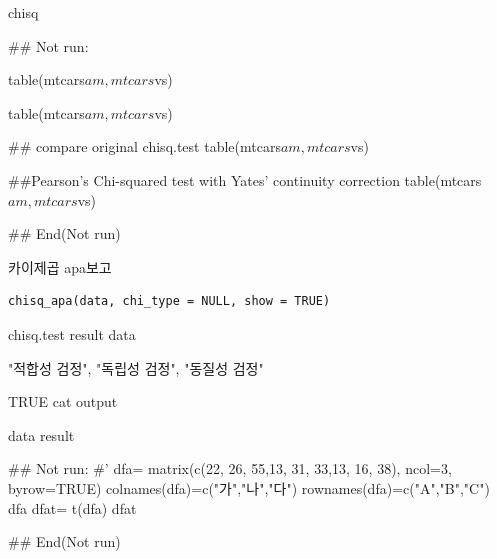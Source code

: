\documentclass[a4paper]{book}
\begin{document}
%
\begin{Value}
chisq
\end{Value}
%
\begin{Examples}
\begin{ExampleCode}
\#\# Not run: 

table(mtcars$am, mtcars$vs) %


table(mtcars$am, mtcars$vs) %

## compare original chisq.test
table(mtcars$am, mtcars$vs) %


##Pearson's Chi-squared test with Yates' continuity correction
table(mtcars$am, mtcars$vs) %

## End(Not run)


\end{ExampleCode}
\end{Examples}
%
\begin{Description}
카이제곱 apa보고
\end{Description}
%
\begin{Usage}
\begin{verbatim}
chisq_apa(data, chi_type = NULL, show = TRUE)
\end{verbatim}
\end{Usage}
%
\begin{Arguments}
\begin{ldescription}
\item[\code{data}] chisq.test result data

\item[\code{chi\_type}] "적합성 검정", "독립성 검정", "동질성 검정"

\item[\code{show}] TRUE cat output
\end{ldescription}
\end{Arguments}
%
\begin{Value}
data result
\end{Value}
%
\begin{Examples}
\begin{ExampleCode}

\#\# Not run: 
#'
dfa= matrix(c(22, 26, 55,13, 31, 33,13, 16, 38), ncol=3, byrow=TRUE)
colnames(dfa)=c("가","나","다")
rownames(dfa)=c("A","B","C")
dfa
dfat= t(dfa)
dfat%

## End(Not run)
\end{ExampleCode}
\end{Examples}
\end{document}
